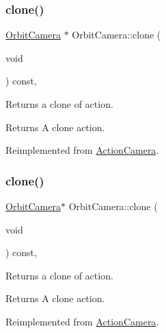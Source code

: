\subsubsection{\texorpdfstring{clone()}{clone()}\hspace{0.1cm}{\footnotesize\ttfamily [1/2]}}
{\footnotesize\ttfamily \hyperlink{classOrbitCamera}{Orbit\+Camera} $\ast$ Orbit\+Camera\+::clone (\begin{DoxyParamCaption}\item[{void}]{ }\end{DoxyParamCaption}) const\hspace{0.3cm}{\ttfamily [override]}, {\ttfamily [virtual]}}

Returns a clone of action.

\begin{DoxyReturn}{Returns}
A clone action. 
\end{DoxyReturn}


Reimplemented from \hyperlink{classActionCamera_a316b7994753b978c45dbe150d6a711e5}{Action\+Camera}.

\mbox{\label{classOrbitCamera_ad3d72a156be5170c01b62a53bf4d6756}} 
\subsubsection{\texorpdfstring{clone()}{clone()}\hspace{0.1cm}{\footnotesize\ttfamily [2/2]}}
{\footnotesize\ttfamily \hyperlink{classOrbitCamera}{Orbit\+Camera}$\ast$ Orbit\+Camera\+::clone (\begin{DoxyParamCaption}\item[{void}]{ }\end{DoxyParamCaption}) const\hspace{0.3cm}{\ttfamily [override]}, {\ttfamily [virtual]}}

Returns a clone of action.

\begin{DoxyReturn}{Returns}
A clone action. 
\end{DoxyReturn}


Reimplemented from \hyperlink{classActionCamera_a316b7994753b978c45dbe150d6a711e5}{Action\+Camera}.

\mbox{\label{classOrbitCamera_ae532b646f3753111665be1c5c9b79d13}} 
